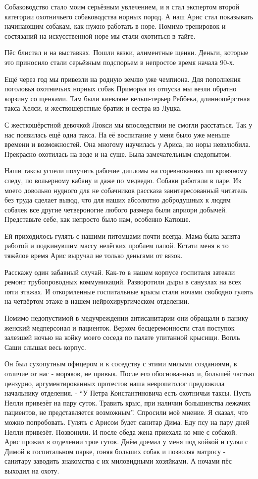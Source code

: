 Собаководство стало моим серьёзным увлечением, и
я стал экспертом второй категории охотничьего собаководства норных пород. А наш
Арис стал показывать начинающим собакам, как нужно работать в норе. Помимо
тренировок и состязаний на искусственной норе мы стали охотиться в тайге. 

Пёс блистал и на выставках. Пошли вязки, алиментные щенки. Деньги, которые это
приносило стали серьёзным подспорьем в непростое время начала 90-х. 

Ещё через год мы привезли на родную землю уже чемпиона. Для пополнения
поголовья охотничьих норных собак Приморья из отпуска мы везли обратно корзину
со щенками. Там были киевляне вельш-терьер Реббека, длинношёрстная такса Хелси,
и жесткошёрстные братик и сестра из Луцка. 

С жесткошёрстной девочкой Люкси мы впоследствии не смогли расстаться. Так у нас
появилась ещё одна такса. На её воспитание у меня было уже меньше времени и
возможностей. Она многому научилась у Ариса, но норы невзлюбила. Прекрасно
охотилась на воде и на суше. Была замечательным следопытом. 

Наши таксы успели получить рабочие дипломы на соревнованиях по кровяному следу,
по вольерному кабану и даже по медведю.  Cобаки работали в паре. Из моего
довольно нудного для не собачников рассказа заинтересованный читатель без труда
сделает вывод, что для наших абсолютно добродушных к людям собачек все другие
четвероногие любого размера были априори добычей. Представьте себе, как
непросто было нам, особенно Катюше. 

Ей приходилось гулять с нашими питомцами почти всегда. Мама была занята работой
и подкинувшим массу нелёгких проблем папой. Кстати меня в то тяжёлое время Арис
выручал не только деньгами от вязок. 

Расскажу один забавный случай. Как-то в нашем корпусе госпиталя затеяли ремонт
трубопроводных коммуникаций. Разворотили дыры в санузлах на всех пяти этажах. И
откормленные госпитальные крысы стали ночами свободно гулять на четвёртом этаже
в нашем нейрохирургическом отделении.

Помимо недопустимой в медучреждении антисанитарии они обращали в панику женский
медперсонал и пациенток. Верхом бесцеремонности стал поступок залезшей ночью на
койку моего соседа по палате упитанной крысищи. Вопль Саши слышал весь корпус.

Он был сухопутным офицером и к соседству с этими милыми созданиями, в отличие
от нас - моряков, не привык. После его обоснованных и, большей частью цензурно,
аргументированных протестов наша невропатолог предложила начальнику отделения.
- \enquote{У Петра Константиновича есть охотничьи таксы. Пусть Нелли привезёт
на пару суток. Травить крыс, при наличии большинства лежачих пациентов, не
представляется возможным}. Спросили моё мнение. Я сказал, что можно
попробовать. Гулять с Арисом будет санитар Дима. Еду псу на пару дней Нелли
привезёт. Позвонили. И после обеда жена приехала ко мне с собакой. Арис прожил
в отделении трое суток. Днём дремал у меня под койкой и гулял с Димой в
госпитальном парке, гоняя больших собак и позволяя матросу - санитару заводить
знакомства с их миловидными хозяйками. А ночами пёс выходил на охоту. 

